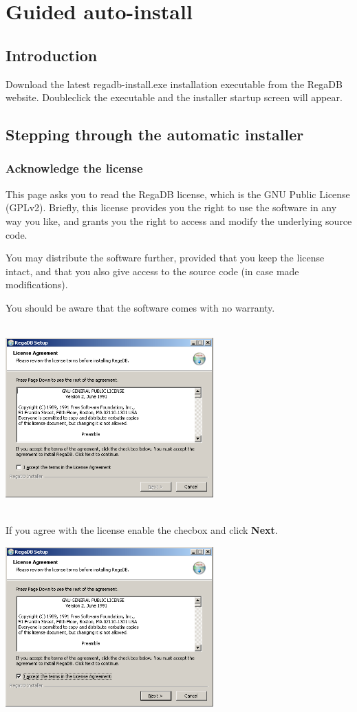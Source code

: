 \chapter{Guided auto-install}
\label{chapter:auto-install}

\section{Introduction}
Download the latest regadb-install.exe installation executable from the RegaDB website. Doubleclick the executable and the installer startup screen will appear.

\section{Stepping through the automatic installer}
\subsection{Acknowledge the license}
This page asks you to read the RegaDB license, which is the GNU Public License (GPLv2). Briefly, this license
provides you the right to use the software in any way you like, and
grants you the right to access and modify the underlying source code.

You may distribute the software further, provided that you keep the
license intact, and that you also give access to the source code (in
case made modifications).

You should be aware that the software comes with no warranty. 
\\
\vspace{0.5cm}~ \\ \centerline{\includegraphics[width=8cm] {pics/nsis/license_agreement_1.png}}
\\
If you agree with the license enable the checbox and click \textbf{Next}.
\vspace{0.5cm}~ \\ \centerline{\includegraphics[width=8cm] {pics/nsis/license_agreement_2.png}}

